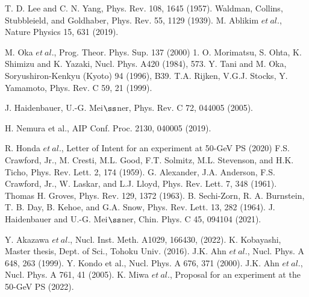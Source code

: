 \begin{thebibliography}{99}
T. D. Lee and C. N. Yang, Phys. Rev. 108, 1645 (1957).
Waldman, Collins, Stubbleield, and Goldhaber, Phys. Rev. 55, 1129 (1939).
M. Ablikim $et\ al.$, Nature Physics 15, 631 (2019).





M. Oka $et\ al.$, Prog. Theor. Phys. Sup. 137 (2000) 1.
O. Morimatsu, S. Ohta, K. Shimizu and K. Yazaki, Nucl. Phys. A420 (1984), 573.
Y. Tani and M. Oka, Soryushiron-Kenkyu (Kyoto) 94 (1996), B39.
T.A. Rijken, V.G.J. Stocks, Y. Yamamoto, Phys. Rev. C 59, 21 (1999).






J. Haidenbauer, U.-G. Mei$\ss$ner, Phys. Rev. C 72, 044005 (2005).

H. Nemura et al., AIP Conf. Proc. 2130, 040005 (2019).




R. Honda $et\ al.$, Letter of Intent for an experiment at 50-GeV PS (2020)
F.S. Crawford, Jr., M. Cresti, M.L. Good, F.T. Solmitz, M.L. Stevenson, and H.K. Ticho, Phys. Rev. Lett. 2, 174 (1959).
G. Alexander, J.A. Anderson, F.S. Crawford, Jr., W. Laskar, and L.J. Lloyd, Phys. Rev. Lett. 7, 348 (1961).
Thomas H. Groves, Phys. Rev. 129, 1372 (1963).
B. Sechi-Zorn, R. A. Burnstein, T. B. Day, B. Kehoe, and G.A. Snow, Phys. Rev. Lett. 13, 282 (1964).
J. Haidenbauer and U.-G. Mei$\ss$ner, Chin. Phys. C 45, 094104 (2021).



Y. Akazawa $et\ al.$, Nucl. Inst. Meth. A1029, 166430, (2022).
K. Kobayashi, Master thesis, Dept. of Sci., Tohoku Univ. (2016).
J.K. Ahn $et\ al.$, Nucl. Phys. A 648, 263 (1999).
Y. Kondo et al., Nucl. Phys. A 676, 371 (2000).
J.K. Ahn $et\ al.$, Nucl. Phys. A 761, 41 (2005).
K. Miwa $et\ al.$, Proposal for an experiment at the 50-GeV PS (2022).



\end{thebibliography}
